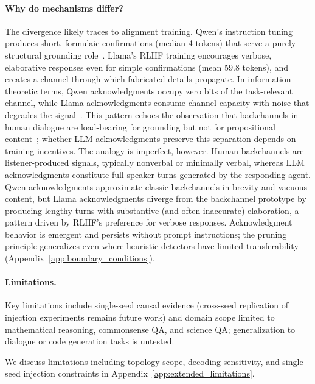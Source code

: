 \paragraph{Why do mechanisms differ?}
The divergence likely traces to alignment training. Qwen's instruction tuning produces short, formulaic confirmations (median 4 tokens) that serve a purely structural grounding role~\cite{clark_contributing_1989}. Llama's RLHF training encourages verbose, elaborative responses even for simple confirmations (mean 59.8 tokens), and creates a channel through which fabricated details propagate. In information-theoretic terms, Qwen acknowledgments occupy zero bits of the task-relevant channel, while Llama acknowledgments consume channel capacity with noise that degrades the signal~\cite{shannon_1948}. This pattern echoes the observation that backchannels in human dialogue are load-bearing for grounding but not for propositional content~\cite{bavelas_co_narrators_2000}; whether LLM acknowledgments preserve this separation depends on training incentives. The analogy is imperfect, however. Human backchannels are listener-produced signals, typically nonverbal or minimally verbal, whereas LLM acknowledgments constitute full speaker turns generated by the responding agent. Qwen acknowledgments approximate classic backchannels in brevity and vacuous content, but Llama acknowledgments diverge from the backchannel prototype by producing lengthy turns with substantive (and often inaccurate) elaboration, a pattern driven by RLHF's preference for verbose responses. Acknowledgment behavior is emergent and persists without prompt instructions; the pruning principle generalizes even where heuristic detectors have limited transferability (Appendix~\ref{app:boundary_conditions}).

\paragraph{Limitations.}
Key limitations include single-seed causal evidence (cross-seed replication of injection experiments remains future work) and domain scope limited to mathematical reasoning, commonsense QA, and science QA; generalization to dialogue or code generation tasks is untested.

We discuss limitations including topology scope, decoding sensitivity, and single-seed injection constraints in Appendix~\ref{app:extended_limitations}.
